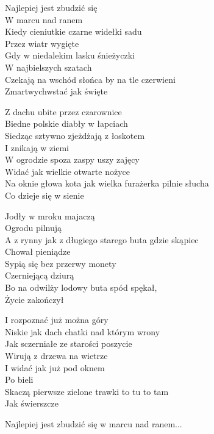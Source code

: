 \begin{text}
Najlepiej jest zbudzić się\\
W marcu nad ranem\\
Kiedy cieniutkie czarne widełki sadu\\
Przez wiatr wygięte\\
Gdy w niedalekim lasku śnieżyczki\\
W najbielszych szatach\\
Czekają na wschód słońca by na tle czerwieni\\
Zmartwychwstać jak święte

Z dachu ubite przez czarownice\\
Biedne polskie diabły w łapciach\\
Siedząc sztywno zjeżdżają z łoskotem\\
I znikają w ziemi\\
W ogrodzie spoza zaspy uszy zajęcy\\
Widać jak wielkie otwarte nożyce\\
Na oknie głowa kota jak wielka furażerka pilnie słucha\\
Co dzieje się w sienie

Jodły w mroku majaczą\\
Ogrodu pilnują\\
A z rynny jak z długiego starego buta gdzie skąpiec\\
Chował pieniądze\\
Sypią się bez przerwy monety\\
Czerniejącą dziurą\\
Bo na odwilży lodowy buta spód spękał,\\
Życie zakończył

I rozpoznać już można góry\\
Niskie jak dach chatki nad którym wrony\\
Jak sczerniałe ze starości poszycie\\
Wirują z drzewa na wietrze\\
I widać jak już pod oknem\\
Po bieli\\
Skaczą pierwsze zielone trawki to tu to tam\\
Jak świerszcze

Najlepiej jest zbudzić się w marcu nad ranem...
\end{text}

